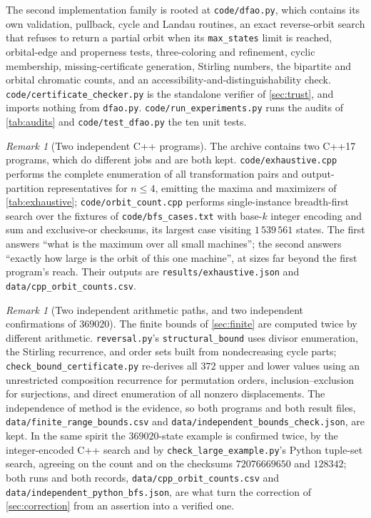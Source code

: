 \documentclass[11pt,a4paper]{article}
\numberwithin{equation}{section}
\theoremstyle{definition}
\theoremstyle{remark}
\newtheorem{remark}[theorem]{Remark}
\begin{document}
The second implementation family is rooted at \texttt{code/dfao.py}, which
contains its own validation, pullback, cycle and Landau routines, an exact
reverse-orbit search that refuses to return a partial orbit when its
\texttt{max\_states} limit is reached, orbital-edge and properness tests,
three-coloring and refinement, cyclic membership, missing-certificate
generation, Stirling numbers, the bipartite and orbital chromatic counts, and
an accessibility-and-distinguishability check.
\texttt{code/certificate\_checker.py} is the standalone verifier of
\cref{sec:trust}, and imports nothing from \texttt{dfao.py}.
\texttt{code/run\_experiments.py} runs the audits of \cref{tab:audits} and
\texttt{code/test\_dfao.py} the ten unit tests.

\begin{remark}[Two independent C++ programs]\label{rem:twocpp}
The archive contains two C++17 programs, which do different jobs and are both
kept. \texttt{code/exhaustive.cpp} performs the complete enumeration of all
transformation pairs and output-partition representatives for $n\le4$,
emitting the maxima and maximizers of \cref{tab:exhaustive};
\texttt{code/orbit\_count.cpp} performs single-instance breadth-first search
over the fixtures of \texttt{code/bfs\_cases.txt} with base-$k$ integer
encoding and sum and exclusive-or checksums, its largest case visiting
$1\,539\,561$ states. The first answers ``what is the maximum over all small
machines''; the second answers ``exactly how large is the orbit of this one
machine'', at sizes far beyond the first program's reach. Their outputs are
\texttt{results/exhaustive.json} and \texttt{data/cpp\_orbit\_counts.csv}.
\end{remark}

\begin{remark}[Two independent arithmetic paths, and two independent
confirmations of $369020$]\label{rem:twoarith}
The finite bounds of \cref{sec:finite} are computed twice by different
arithmetic. \texttt{reversal.py}'s \texttt{structural\_bound} uses divisor
enumeration, the Stirling recurrence, and order sets built from nondecreasing
cycle parts; \texttt{check\_bound\_certificate.py} re-derives all $372$ upper
and lower values using an unrestricted composition recurrence for permutation
orders, inclusion--exclusion for surjections, and direct enumeration of all
nonzero displacements. The independence of method is the evidence, so both
programs and both result files, \texttt{data/finite\_range\_bounds.csv} and
\texttt{data/independent\_bounds\_check.json}, are kept. In the same spirit
the $369020$-state example is confirmed twice, by the integer-encoded C++
search and by \texttt{check\_large\_example.py}'s Python tuple-set search,
agreeing on the count and on the checksums $72076669650$ and $128342$; both
runs and both records, \texttt{data/cpp\_orbit\_counts.csv} and
\texttt{data/independent\_python\_bfs.json}, are what turn the correction of
\cref{sec:correction} from an assertion into a verified one.
\end{remark}
\end{document}
